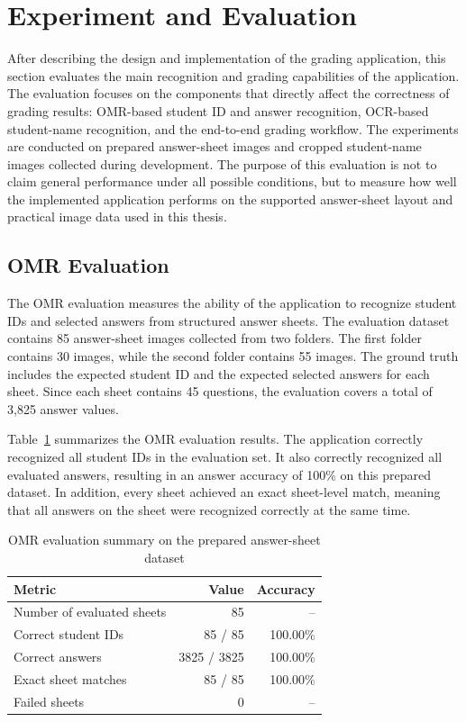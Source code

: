 \documentclass[../Main.tex]{subfiles}
\begin{document}
\section{Experiment and Evaluation}
\label{section:4.3}

After describing the design and implementation of the grading application, this
section evaluates the main recognition and grading capabilities of the
application. The evaluation focuses on the components that directly affect the
correctness of grading results: OMR-based student ID and answer recognition,
OCR-based student-name recognition, and the end-to-end grading workflow. The
experiments are conducted on prepared answer-sheet images and cropped
student-name images collected during development. The purpose of this evaluation
is not to claim general performance under all possible conditions, but to
measure how well the implemented application performs on the supported
answer-sheet layout and practical image data used in this thesis.

\subsection{OMR Evaluation}
\label{subsection:4.3.1}

The OMR evaluation measures the ability of the application to recognize
student IDs and selected answers from structured answer sheets. The evaluation
dataset contains 85 answer-sheet images collected from two folders. The first
folder contains 30 images, while the second folder contains 55 images. The
ground truth includes the expected student ID and the expected selected answers
for each sheet. Since each sheet contains 45 questions, the evaluation covers a
total of 3,825 answer values.

Table~\ref{table:omr_evaluation_summary} summarizes the OMR evaluation results.
The application correctly recognized all student IDs in the evaluation set. It
also correctly recognized all evaluated answers, resulting in an answer
accuracy of 100\% on this prepared dataset. In addition, every sheet achieved an
exact sheet-level match, meaning that all answers on the sheet were recognized
correctly at the same time.

\begin{table}[H]
\centering
\caption{OMR evaluation summary on the prepared answer-sheet dataset}
\label{table:omr_evaluation_summary}
\begin{tabular}{lrr}
\hline
\textbf{Metric} & \textbf{Value} & \textbf{Accuracy} \\ \hline
Number of evaluated sheets & 85 & -- \\
Correct student IDs & 85 / 85 & 100.00\% \\
Correct answers & 3825 / 3825 & 100.00\% \\
Exact sheet matches & 85 / 85 & 100.00\% \\
Failed sheets & 0 & -- \\ \hline
\end{tabular}
\end{table}
\end{document}
